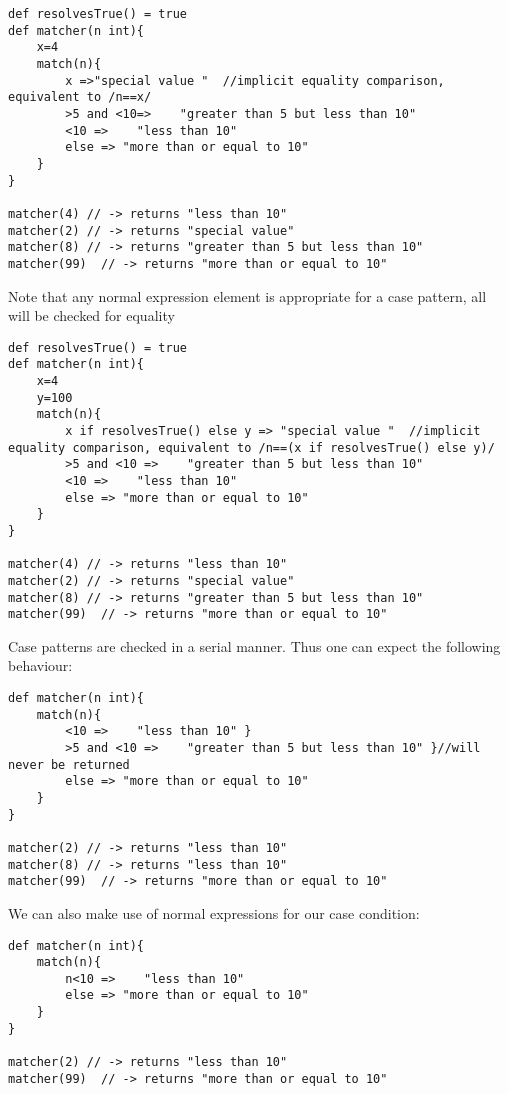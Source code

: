 \documentclass[conc-doc]{subfiles}
\begin{document}
\begin{lstlisting}
def resolvesTrue() = true
def matcher(n int){
	x=4
	match(n){
		x =>"special value "  //implicit equality comparison, equivalent to /n==x/
		>5 and <10=>    "greater than 5 but less than 10" 
		<10 =>    "less than 10" 
		else => "more than or equal to 10" 
	}
}

matcher(4) // -> returns "less than 10"
matcher(2) // -> returns "special value"
matcher(8) // -> returns "greater than 5 but less than 10"
matcher(99)  // -> returns "more than or equal to 10"
\end{lstlisting}

Note that any normal expression element is appropriate for a case pattern, all will be checked for equality

\begin{lstlisting}
def resolvesTrue() = true
def matcher(n int){
	x=4
	y=100
	match(n){
		x if resolvesTrue() else y => "special value "  //implicit equality comparison, equivalent to /n==(x if resolvesTrue() else y)/
		>5 and <10 =>    "greater than 5 but less than 10" 
		<10 =>    "less than 10" 
		else => "more than or equal to 10" 
	}
}

matcher(4) // -> returns "less than 10"
matcher(2) // -> returns "special value"
matcher(8) // -> returns "greater than 5 but less than 10"
matcher(99)  // -> returns "more than or equal to 10"
\end{lstlisting}

Case patterns are checked in a serial manner. Thus one can expect the following behaviour:

\begin{lstlisting}
def matcher(n int){
	match(n){
		<10 =>    "less than 10" }
		>5 and <10 =>    "greater than 5 but less than 10" }//will never be returned
		else => "more than or equal to 10"
	}
}

matcher(2) // -> returns "less than 10"
matcher(8) // -> returns "less than 10"
matcher(99)  // -> returns "more than or equal to 10"
\end{lstlisting}

We can also make use of normal expressions for our case condition:

\begin{lstlisting}
def matcher(n int){
	match(n){
		n<10 =>    "less than 10" 
		else => "more than or equal to 10" 
	}
}

matcher(2) // -> returns "less than 10"
matcher(99)  // -> returns "more than or equal to 10"
\end{lstlisting}
\end{document}

